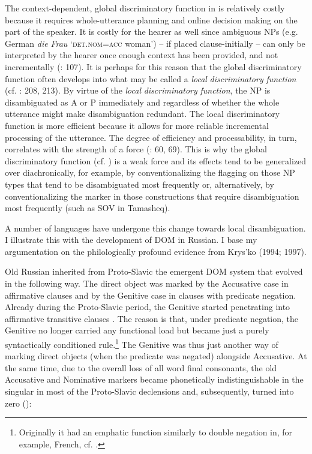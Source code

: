 \documentclass[output=paper]{langsci/langscibook}
\begin{document}
The context-dependent, global discriminatory function in  is relatively costly because it requires whole-utterance planning and online decision making on the part of the speaker. It is costly for the hearer as well since ambiguous NPs (e.g. German \textit{die} \textit{Frau} ‘\textsc{det.nom=acc} woman’) – if placed clause-initially – can only be interpreted by the hearer once enough context has been provided, and not incrementally (\citealt{Bornkessel-SchlesewskySchlesewsky2014}: 107). It is perhaps for this reason that the global discriminatory function often develops into what may be called a \textit{local} \textit{discriminatory} \textit{function} (cf. \citealt{Aissen2003,ZeevatJäger2002,Jäger2004,Malchukov2008}: 208, 213). By virtue of the \textit{local} \textit{discriminatory} \textit{function}, the NP is disambiguated as A or P immediately and regardless of whether the whole utterance might make disambiguation redundant. The local discriminatory function is more efficient because it allows for more reliable incremental processing of the utterance. The degree of efficiency and processability, in turn, correlates with the strength of a force (\citealt{Hawkins2014}: 60, 69). This is why the global discriminatory function (cf. ) is a weak force and its effects tend to be generalized over diachronically, for example, by conventionalizing the flagging on those NP types that tend to be disambiguated most frequently or, alternatively, by conventionalizing the marker in those constructions that require disambiguation most frequently (such as SOV in Tamasheq). 

A number of languages have undergone this change towards local disambiguation. I illustrate this with the development of DOM in Russian. I base my argumentation on the philologically profound evidence from Krys’ko (1994; 1997). 

Old Russian inherited from Proto-Slavic the emergent DOM system that evolved in the following way. The direct object was marked by the Accusative case in affirmative clauses and by the Genitive case in clauses with predicate negation. Already during the Proto-Slavic period, the Genitive started penetrating into affirmative transitive clauses \citep{Klenin1983}. The reason is that, under predicate negation, the Genitive no longer carried any functional load but became just a purely syntactically conditioned rule.\footnote{Originally it had an emphatic function similarly to double negation in, for example, French, cf. \citet{Kuryłowicz1971}.} The Genitive was thus just another way of marking direct objects (when the predicate was negated) alongside Accusative. At the same time, due to the overall loss of all word final consonants, the old Accusative and Nominative markers became phonetically indistinguishable in the singular in most of the Proto-Slavic declensions and, subsequently, turned into zero ():
\end{document}
